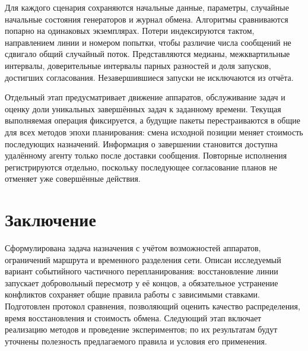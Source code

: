\documentclass{misisarticle}
\begin{document}
Для каждого сценария сохраняются начальные данные, параметры, случайные начальные состояния генераторов и журнал обмена. Алгоритмы сравниваются попарно на одинаковых экземплярах. Потери индексируются тактом, направлением линии и номером попытки, чтобы различие числа сообщений не сдвигало общий случайный поток. Представляются медианы, межквартильные интервалы, доверительные интервалы парных разностей и доля запусков, достигших согласования. Незавершившиеся запуски не исключаются из отчёта.

Отдельный этап предусматривает движение аппаратов, обслуживание задач и оценку доли уникальных завершённых задач к заданному времени. Текущая выполняемая операция фиксируется, а будущие пакеты перестраиваются в общие для всех методов эпохи планирования: смена исходной позиции меняет стоимость последующих назначений. Информация о завершении становится доступна удалённому агенту только после доставки сообщения. Повторные исполнения регистрируются отдельно, поскольку последующее согласование планов не отменяет уже совершённые действия.

\section{Заключение}

Сформулирована задача назначения с учётом возможностей аппаратов, ограничений маршрута и временного разделения сети. Описан исследуемый вариант событийного частичного перепланирования: восстановление линии запускает добровольный пересмотр у её концов, а обязательное устранение конфликтов сохраняет общие правила работы с зависимыми ставками. Подготовлен протокол сравнения, позволяющий оценить качество распределения, время восстановления и стоимость обмена. Следующий этап включает реализацию методов и проведение экспериментов; по их результатам будут уточнены полезность предлагаемого правила и условия его применения.
\end{document}
